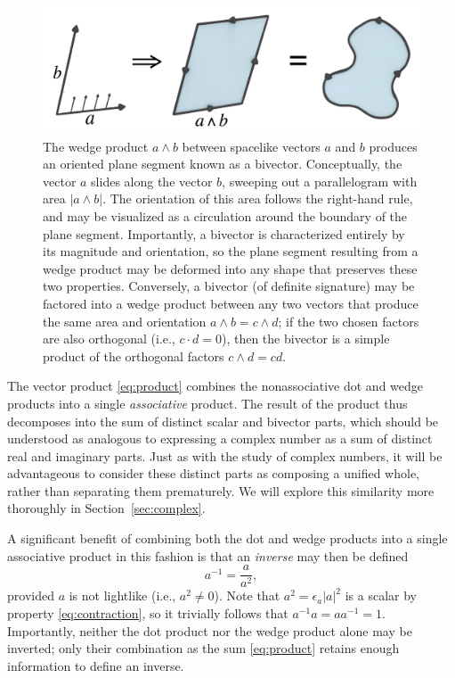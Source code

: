 \documentclass[1p,sort&compress]{elsarticle}
\numberwithin{equation}{section}
\begin{document}
\begin{figure}[t]
  \begin{center}
    \includegraphics[width=0.7\columnwidth]{Fig1.png}
  \end{center}
  \caption[Wedge product]{The wedge product $a \wedge b$ between spacelike vectors $a$ and $b$ produces an oriented plane segment known as a bivector.  Conceptually, the vector $a$ slides along the vector $b$, sweeping out a parallelogram with area $|a\wedge b|$.  The orientation of this area follows the right-hand rule, and may be visualized as a circulation around the boundary of the plane segment.  Importantly, a bivector is characterized entirely by its magnitude and orientation, so the plane segment resulting from a wedge product may be deformed into any shape that preserves these two properties.  Conversely, a bivector (of definite signature) may be factored into a wedge product between any two vectors that produce the same area and orientation $a\wedge b = c\wedge d$; if the two chosen factors are also orthogonal (i.e., $c\cdot d = 0$), then the bivector is a simple product of the orthogonal factors $c\wedge d = cd$.}
  \label{fig:bivector}
\end{figure}

The vector product \eqref{eq:product} combines the nonassociative dot and wedge products into a single \emph{associative} product.  The result of the product thus decomposes into the sum of distinct scalar and bivector parts, which should be understood as analogous to expressing a complex number as a sum of distinct real and imaginary parts.  Just as with the study of complex numbers, it will be advantageous to consider these distinct parts as composing a unified whole, rather than separating them prematurely.  We will explore this similarity more thoroughly in Section~\ref{sec:complex}.  

A significant benefit of combining both the dot and wedge products into a single associative product in this fashion is that an \emph{inverse} may then be defined 
\begin{equation}\label{eq:inverse}
  a^{-1} = \frac{a}{a^2},
\end{equation}
provided $a$ is not lightlike (i.e., $a^2 \neq 0$).  Note that $a^2 = \epsilon_a |a|^2$ is a scalar by property \eqref{eq:contraction}, so it trivially follows that $a^{-1}a = a a^{-1} = 1$.  Importantly, neither the dot product nor the wedge product alone may be inverted; only their combination as the sum \eqref{eq:product} retains enough information to define an inverse.
\end{document}
